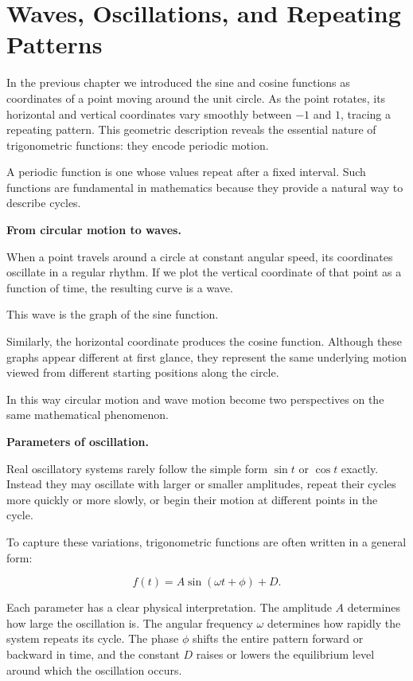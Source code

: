 \documentclass[11pt, openany]{book}
\theoremstyle{plain}
\theoremstyle{definition}
\theoremstyle{remark}
\begin{document}
\section*{Waves, Oscillations, and Repeating Patterns}

In the previous chapter we introduced the sine and cosine functions as
coordinates of a point moving around the unit circle. As the point
rotates, its horizontal and vertical coordinates vary smoothly between
$-1$ and $1$, tracing a repeating pattern. This geometric description
reveals the essential nature of trigonometric functions: they encode
periodic motion.

A periodic function is one whose values repeat after a fixed interval.
Such functions are fundamental in mathematics because they provide a
natural way to describe cycles.

\medskip

\textbf{From circular motion to waves.}

When a point travels around a circle at constant angular speed, its
coordinates oscillate in a regular rhythm. If we plot the vertical
coordinate of that point as a function of time, the resulting curve is a
wave.

This wave is the graph of the sine function.

Similarly, the horizontal coordinate produces the cosine function.
Although these graphs appear different at first glance, they represent
the same underlying motion viewed from different starting positions
along the circle.

In this way circular motion and wave motion become two perspectives on
the same mathematical phenomenon.

\medskip

\textbf{Parameters of oscillation.}

Real oscillatory systems rarely follow the simple form $\sin t$ or
$\cos t$ exactly. Instead they may oscillate with larger or smaller
amplitudes, repeat their cycles more quickly or more slowly, or begin
their motion at different points in the cycle.

To capture these variations, trigonometric functions are often written
in a general form:

\[
f(t) = A \sin(\omega t + \phi) + D .
\]

Each parameter has a clear physical interpretation. The amplitude $A$
determines how large the oscillation is. The angular frequency $\omega$
determines how rapidly the system repeats its cycle. The phase $\phi$
shifts the entire pattern forward or backward in time, and the constant
$D$ raises or lowers the equilibrium level around which the oscillation
occurs.
\end{document}
